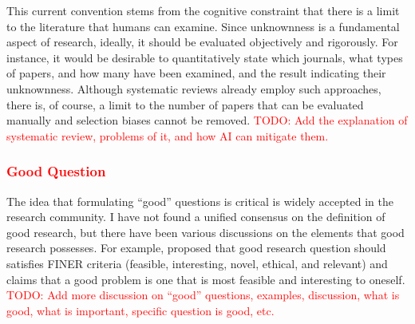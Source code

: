 \documentclass{book}
\begin{document}

This current convention stems from the cognitive constraint that there is a limit to the literature that humans can examine. Since unknownness is a fundamental aspect of research, ideally, it should be evaluated objectively and rigorously. For instance, it would be desirable to quantitatively state which journals, what types of papers, and how many have been examined, and the result indicating their unknownness. Although systematic reviews already employ such approaches, there is, of course, a limit to the number of papers that can be evaluated manually and selection biases cannot be removed. \textcolor{red}{TODO: Add the explanation of systematic review, problems of it, and how AI can mitigate them.}

\subsubsection{\textcolor{red}{Good Question}}

The idea that formulating ``good'' questions is critical is widely accepted in the research community. I have not found a unified consensus on the definition of good research, but there have been various discussions on the elements that good research possesses. For example, \cite{hulley2007designing} proposed that good research question should satisfies FINER criteria (feasible, interesting, novel, ethical, and relevant) and \cite{alon2009choose} claims that a good problem is one that is most feasible and interesting to oneself. \textcolor{red}{TODO: Add more discussion on ``good'' questions, examples, discussion, what is good, what is important, specific question is good, etc.}


\end{document}
